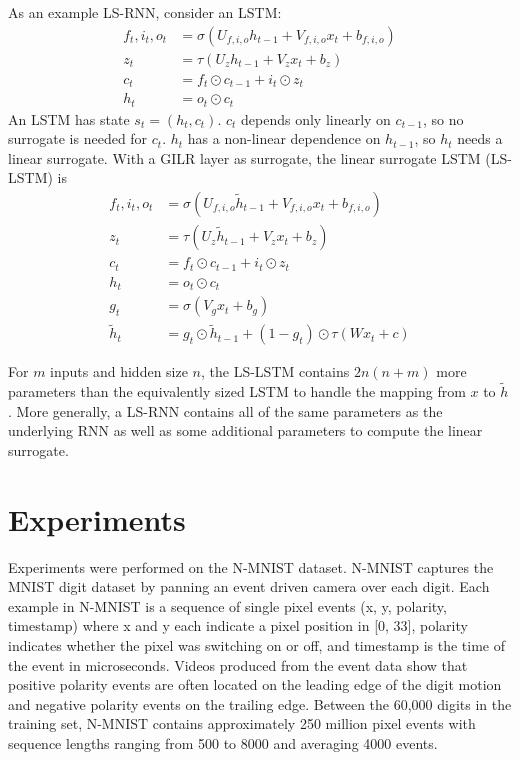 \documentclass{article}
\begin{document}
As an example LS-RNN, consider an LSTM:
\begin{align*}
f_t, i_t, o_t &= \sigma(U_{f,i,o} h_{t-1} + V_{f,i,o} x_t + b_{f,i,o}) \\
z_t &= \tau(U_z h_{t-1} + V_z x_t + b_z) \\
c_t &= f_t \odot c_{t-1} + i_t \odot z_t \\
h_t &= o_t \odot c_t
\end{align*}
An LSTM has state $s_t = (h_t, c_t)$. $c_t$ depends only linearly on $c_{t-1}$, so no surrogate is needed for $c_t$. $h_t$ has a non-linear dependence on $h_{t-1}$, so $h_t$ needs a linear surrogate. With a GILR layer as surrogate, the linear surrogate LSTM (LS-LSTM) is
\begin{align*}
f_t, i_t, o_t &= \sigma(U_{f,i,o} \tilde{h}_{t-1} + V_{f,i,o} x_t + b_{f,i,o}) \\
z_t &= \tau(U_z \tilde{h}_{t-1} + V_z x_t + b_z) \\
c_t &= f_t \odot c_{t-1} + i_t \odot z_t \\
h_t &= o_t \odot c_t \\
g_t &= \sigma(V_g x_t + b_g) \\
\tilde{h}_t &= g_t \odot \tilde{h}_{t-1} + (1-g_t)\odot \tau(Wx_t + c)
\end{align*}

For $m$ inputs and hidden size $n$, the LS-LSTM contains $2n(n+m)$ more parameters than the equivalently sized LSTM to handle the mapping from $x$ to $\tilde{h}$. More generally, a LS-RNN contains all of the same parameters as the underlying RNN as well as some additional parameters to compute the linear surrogate.

\section{Experiments}
Experiments were performed on the N-MNIST \cite{orchard2015converting} dataset. N-MNIST captures the MNIST digit dataset \cite{lecun1998mnist} by panning
an event driven camera over each digit. Each example in N-MNIST is a sequence of single pixel events (x, y, polarity, timestamp) where
x and y each indicate a pixel position in [0, 33], polarity indicates whether the pixel was switching on or off, and timestamp is the time of the event in microseconds. Videos produced from the event data show that positive polarity events are often located on the leading edge of the digit motion and negative polarity events on the trailing edge. Between the 60,000 digits in the training set, N-MNIST contains approximately 250 million pixel events with sequence lengths ranging from 500 to 8000 and averaging 4000 events.
\end{document}
